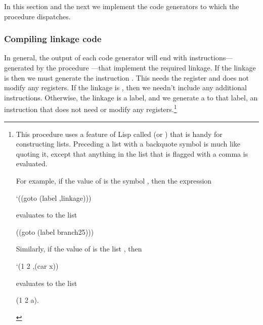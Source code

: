 In this section and the next we implement the code generators to which the
 procedure dispatches.

\subsubsection*{Compiling linkage code}

In general, the output of each code generator will end with
instructions---generated by the procedure ---that
implement the required linkage.  If the linkage is  then we must
generate the instruction .  This needs the
 register and does not modify any registers.  If the linkage is
, then we needn't include any additional instructions.  Otherwise,
the linkage is a label, and we generate a  to that label, an
instruction that does not need or modify any registers.\footnote{This procedure
uses a feature of Lisp called  (or )
that is handy for constructing lists.  Preceding a list with a backquote symbol
is much like quoting it, except that anything in the list that is flagged with
a comma is evaluated.

For example, if the value of  is the symbol ,
then the expression

\begin{smallscheme}
`((goto (label ,linkage)))
\end{smallscheme}

\noindent
evaluates to the list

\begin{smallscheme}
((goto (label branch25)))
\end{smallscheme}

\noindent
Similarly, if the value of  is the list , then

\begin{smallscheme}
`(1 2 ,(car x))
\end{smallscheme}

\noindent
evaluates to the list

\begin{smallscheme}
(1 2 a).
\end{smallscheme}
}


